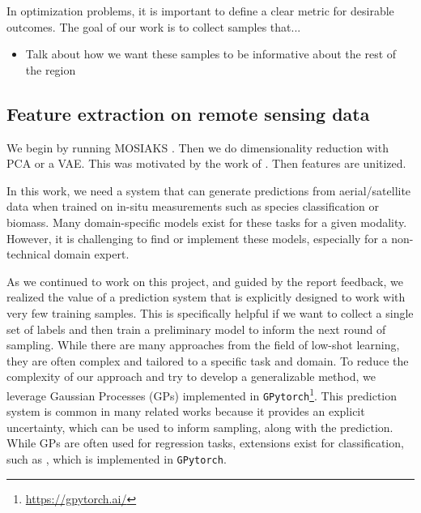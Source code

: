 In optimization problems, it is important to define a clear metric for desirable outcomes. The goal of our work is to collect samples that...
\begin{itemize}
    \item Talk about how we want these samples to be informative about the rest of the region 
\end{itemize}


\subsection{Feature extraction on remote sensing data}
We begin by running MOSIAKS \cite{Rolf2021}. Then we do dimensionality reduction with PCA or a VAE. This was motivated by the work of \cite{Candela2020PlanetaryMapping}. Then features are unitized. 

In this work, we need a system that can generate predictions from aerial/satellite data when trained on in-situ measurements such as species classification or biomass. Many domain-specific models exist for these tasks for a given modality. However, it is challenging to find or implement these models, especially for a non-technical domain expert. 

As we continued to work on this project, and guided by the report feedback, we realized the value of a prediction system that is explicitly designed to work with very few training samples. This is specifically helpful if we want to collect a single set of labels and then train a preliminary model to inform the next round of sampling. While there are many approaches from the field of low-shot learning, they are often complex and tailored to a specific task and domain. To reduce the complexity of our approach and try to develop a generalizable method, we leverage Gaussian Processes (GPs) \cite{Rasmussen2004} implemented in \texttt{GPytorch}\footnote{\url{https://gpytorch.ai/}}. This prediction system is common in many related works because it provides an explicit uncertainty, which can be used to inform sampling, along with the prediction. While GPs are often used for regression tasks, extensions exist for classification, such as \cite{milios2018dirichletbased}, which is implemented in \texttt{GPytorch}.

